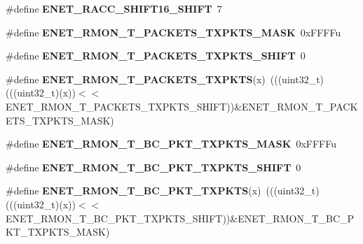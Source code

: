 \begin{DoxyCompactItemize}
\item 
\#define {\bfseries E\+N\+E\+T\+\_\+\+R\+A\+C\+C\+\_\+\+S\+H\+I\+F\+T16\+\_\+\+S\+H\+I\+FT}~7\hypertarget{group__ENET__Register__Masks_gaa96c07fba3d15bc1cdd32bd4f7b94998}{}\label{group__ENET__Register__Masks_gaa96c07fba3d15bc1cdd32bd4f7b94998}

\item 
\#define {\bfseries E\+N\+E\+T\+\_\+\+R\+M\+O\+N\+\_\+\+T\+\_\+\+P\+A\+C\+K\+E\+T\+S\+\_\+\+T\+X\+P\+K\+T\+S\+\_\+\+M\+A\+SK}~0x\+F\+F\+F\+Fu\hypertarget{group__ENET__Register__Masks_gaae18bf5610b11cd5c5418e426bfc9faf}{}\label{group__ENET__Register__Masks_gaae18bf5610b11cd5c5418e426bfc9faf}

\item 
\#define {\bfseries E\+N\+E\+T\+\_\+\+R\+M\+O\+N\+\_\+\+T\+\_\+\+P\+A\+C\+K\+E\+T\+S\+\_\+\+T\+X\+P\+K\+T\+S\+\_\+\+S\+H\+I\+FT}~0\hypertarget{group__ENET__Register__Masks_gaedbb5b49e8c1f579fb37ff45c77739b1}{}\label{group__ENET__Register__Masks_gaedbb5b49e8c1f579fb37ff45c77739b1}

\item 
\#define {\bfseries E\+N\+E\+T\+\_\+\+R\+M\+O\+N\+\_\+\+T\+\_\+\+P\+A\+C\+K\+E\+T\+S\+\_\+\+T\+X\+P\+K\+TS}(x)~(((uint32\+\_\+t)(((uint32\+\_\+t)(x))$<$$<$E\+N\+E\+T\+\_\+\+R\+M\+O\+N\+\_\+\+T\+\_\+\+P\+A\+C\+K\+E\+T\+S\+\_\+\+T\+X\+P\+K\+T\+S\+\_\+\+S\+H\+I\+FT))\&E\+N\+E\+T\+\_\+\+R\+M\+O\+N\+\_\+\+T\+\_\+\+P\+A\+C\+K\+E\+T\+S\+\_\+\+T\+X\+P\+K\+T\+S\+\_\+\+M\+A\+SK)\hypertarget{group__ENET__Register__Masks_ga8e671cdf2c95c8dfd6c9260b47360901}{}\label{group__ENET__Register__Masks_ga8e671cdf2c95c8dfd6c9260b47360901}

\item 
\#define {\bfseries E\+N\+E\+T\+\_\+\+R\+M\+O\+N\+\_\+\+T\+\_\+\+B\+C\+\_\+\+P\+K\+T\+\_\+\+T\+X\+P\+K\+T\+S\+\_\+\+M\+A\+SK}~0x\+F\+F\+F\+Fu\hypertarget{group__ENET__Register__Masks_ga025847a04f4151ea174abb193896779d}{}\label{group__ENET__Register__Masks_ga025847a04f4151ea174abb193896779d}

\item 
\#define {\bfseries E\+N\+E\+T\+\_\+\+R\+M\+O\+N\+\_\+\+T\+\_\+\+B\+C\+\_\+\+P\+K\+T\+\_\+\+T\+X\+P\+K\+T\+S\+\_\+\+S\+H\+I\+FT}~0\hypertarget{group__ENET__Register__Masks_ga85a6d86c558cd12bad95c0bd1fa9ac42}{}\label{group__ENET__Register__Masks_ga85a6d86c558cd12bad95c0bd1fa9ac42}

\item 
\#define {\bfseries E\+N\+E\+T\+\_\+\+R\+M\+O\+N\+\_\+\+T\+\_\+\+B\+C\+\_\+\+P\+K\+T\+\_\+\+T\+X\+P\+K\+TS}(x)~(((uint32\+\_\+t)(((uint32\+\_\+t)(x))$<$$<$E\+N\+E\+T\+\_\+\+R\+M\+O\+N\+\_\+\+T\+\_\+\+B\+C\+\_\+\+P\+K\+T\+\_\+\+T\+X\+P\+K\+T\+S\+\_\+\+S\+H\+I\+FT))\&E\+N\+E\+T\+\_\+\+R\+M\+O\+N\+\_\+\+T\+\_\+\+B\+C\+\_\+\+P\+K\+T\+\_\+\+T\+X\+P\+K\+T\+S\+\_\+\+M\+A\+SK)\hypertarget{group__ENET__Register__Masks_ga44c8eef437f06566360fde04150c385c}{}\label{group__ENET__Register__Masks_ga44c8eef437f06566360fde04150c385c}


\end{DoxyCompactItemize}
